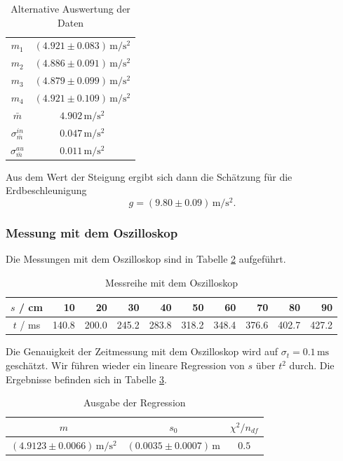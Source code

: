 \documentclass[a4paper, 12pt]{scrartcl}
\begin{document}
\begin{table}[h!]
\begin{center}
\begin{tabular}{c|c}
$m_1$ & $(4.921 \pm 0.083) \, \mathrm m / \mathrm s^2$ \\ 
$m_2$ & $(4.886 \pm 0.091) \, \mathrm m / \mathrm s^2$ \\
$m_3$ & $(4.879 \pm 0.099) \, \mathrm m / \mathrm s^2$ \\
$m_4$ & $(4.921 \pm 0.109) \, \mathrm m / \mathrm s^2$ \\
\hline
$\bar m$ & $4.902 \, \mathrm m / \mathrm s^2$ \\
$\sigma^{in}_{\bar m}$ & $0.047 \, \mathrm m / \mathrm s^2$ \\
$\sigma^{au}_{\bar m}$ & $0.011 \, \mathrm m / \mathrm s^2$
\end{tabular}
\caption{Alternative Auswertung der Daten}
\label{tableAltAus}
\end{center}
\end{table}
Aus dem Wert der Steigung ergibt sich dann die Schätzung für die Erdbeschleunigung
$$g = (9.80 \pm 0.09) \, \mathrm m / \mathrm s^2 .$$

\subsubsection{Messung mit dem Oszilloskop}

Die Messungen mit dem Oszilloskop sind in Tabelle \ref{tableOs} aufgeführt. 
\begin{table}[h!]
\begin{center}
\begin{tabular}{c|r|r|r|r|r|r|r|r|r}
$s$ / cm & 10 & 20 & 30 & 40 & 50 & 60 & 70 & 80 & 90 \\
\hline
$t$ / ms & 140.8 & 200.0 & 245.2 & 283.8 & 318.2 & 348.4 & 376.6 & 402.7 & 427.2 \\
\end{tabular}
\caption{Messreihe mit dem Oszilloskop}
\label{tableOs}
\end{center}
\end{table}

Die Genauigkeit der Zeitmessung mit dem Oszilloskop wird auf $\sigma_t = 0.1 \, \mathrm{ms}$ geschätzt. Wir führen wieder ein lineare Regression von $s$ über $t^2$ durch. Die Ergebnisse befinden sich in Tabelle \ref{tableReg2}.

\begin{table}[h!]
\begin{center}
\begin{tabular}{c|c|c}
$m$ & $s_0$ & $\chi^2/n_{df}$ \\
\hline
$(4.9123 \pm 0.0066) \, \mathrm m / \mathrm s^2$ & $(0.0035 \pm 0.0007) \, \mathrm m$ & $0.5$
\end{tabular}
\caption{Ausgabe der Regression}
\label{tableReg2}
\end{center}
\end{table}
\end{document}
